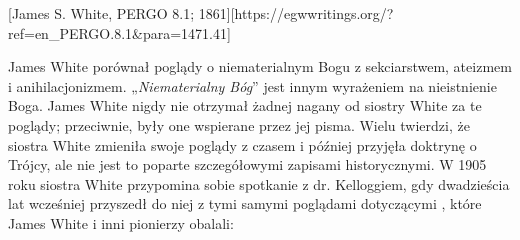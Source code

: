 [James S. White, PERGO 8.1; 1861][https://egwwritings.org/?ref=en\_PERGO.8.1&para=1471.41]

James White porównał poglądy o niematerialnym Bogu z sekciarstwem, ateizmem i anihilacjonizmem. „\textit{Niematerialny Bóg}” jest innym wyrażeniem na nieistnienie Boga. James White nigdy nie otrzymał żadnej nagany od siostry White za te poglądy; przeciwnie, były one wspierane przez jej pisma. Wielu twierdzi, że siostra White zmieniła swoje poglądy z czasem i później przyjęła doktrynę o Trójcy, ale nie jest to poparte szczegółowymi zapisami historycznymi. W 1905 roku siostra White przypomina sobie spotkanie z dr. Kelloggiem, gdy dwadzieścia lat wcześniej przyszedł do niej z tymi samymi poglądami dotyczącymi , które James White i inni pionierzy obalali:

